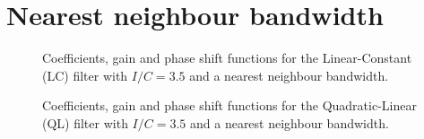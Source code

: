\documentclass[
]{article}
\newcommand\1{\mathds{1}}
\begin{document}
\newpage

\section{Nearest neighbour bandwidth}\label{nearest-neighbour-bandwidth}

\begin{figure}

\caption{\label{fig-graphs-coef-lc-nn}Coefficients, gain and phase shift
functions for the Linear-Constant (LC) filter with \(I/C=3.5\) and a
nearest neighbour bandwidth.}


\end{figure}%

\begin{figure}

\caption{\label{fig-graphs-coef-ql-nn}Coefficients, gain and phase shift
functions for the Quadratic-Linear (QL) filter with \(I/C=3.5\) and a
nearest neighbour bandwidth.}


\end{figure}%
\end{document}
